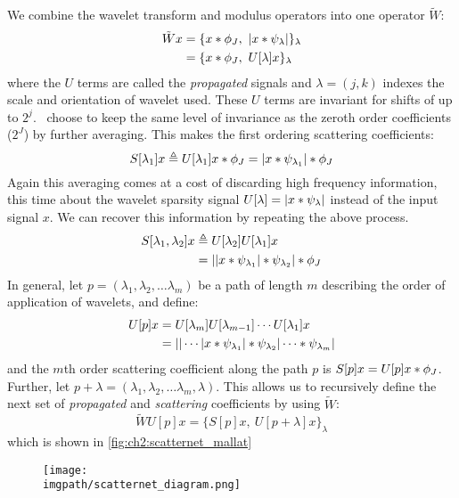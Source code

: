 We combine the wavelet transform and modulus operators into one operator
$\tilde{W}$:
\begin{align}
  \tilde{W}x &= \{ x \ast \phi_J,\ |x \ast \psi_\lambda| \}_\lambda \label{eq:ch2:wave3}\\
             &= \{ x \ast \phi_J,\ U[\lambda]x \}_\lambda 
\end{align}
where the $U$ terms are called the \emph{propagated} signals and $\lambda =
(j,k)$ indexes the scale and orientation of wavelet used.
These $U$ terms are invariant for shifts of up to $2^j$. \Mallat\ choose to
keep the same level of invariance as the zeroth order coefficients ($2^J$) 
by further averaging. This makes the first ordering scattering coefficients:
\begin{equation}
  S[\lambda_1]x \triangleq U[\lambda_1]x \ast \phi_J
  = |x \ast \psi_{\lambda_1}| \ast \phi_J
\end{equation}
Again this averaging comes at a cost of discarding high frequency information,
this time about the wavelet sparsity signal $U[\lambda] = |x \ast
\psi_\lambda|$ instead of the input signal $x$. We can recover this information
by repeating the above process. 
\begin{align}
  S[\lambda_1, \lambda_2]x &\triangleq U[\lambda_2]U[\lambda_1]x \\
                           &=||x \ast \psi_{\lambda_1}| \ast \psi_{\lambda_2}| \ast \phi_J
\end{align}
In general, let $p=(\lambda_1, \lambda_2, \ldots \lambda_m)$ be a path of length
$m$ describing the order of application of wavelets, and define:
\begin{align}
  U[p]x &= U[\lambda_m]U[\lambda_{m-1}]\cdots U[\lambda_1]x \\
        &= || \cdots |x \ast \psi_{\lambda_1}| \ast \psi_{\lambda_2} | \cdots
  \ast \psi_{\lambda_m}|
\end{align}
and the $m$th order scattering coefficient along the path $p$ is $S[p]x = U[p]x
\ast \phi_J$. Further, let $p+\lambda = (\lambda_1, \lambda_2, \ldots
\lambda_m, \lambda)$.  This allows us to recursively define the next set of
\emph{propagated} and \emph{scattering} coefficients by using $\tilde{W}$:
\begin{equation}
  \tilde{W}U[p]x = \{ S[p]x,\ U[p+\lambda]x \}_\lambda \label{eq:ch2:recursive}
\end{equation}
which is shown in \autoref{fig:ch2:scatternet_mallat}
  \begin{figure}
    \centering
      \texttt{[image: \\imgpath/scatternet\_diagram.png]}
      \label{fig:ch2:scatternet_mallat}
  \end{figure}

